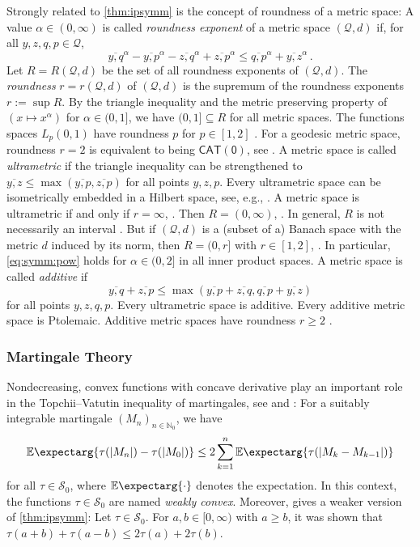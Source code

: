 \documentclass{article}
\renewcommand{\subset}{\subseteq}
\newcommand{\abs}[1]{\left| #1 \right|} %
\newcommand*{\E}{\mathbb{E}} %
\newcommand{\Ex}{\E\expectarg}
\newcommand*{\mc}[1]{\mathcal{#1}}
\newcommand*{\ms}[1]{\mathsf{#1}}
\newcommand{\N}{\mathbb{N}}
\newcommand{\Rp}{[0, \infty)} %
\newcommand{\Rpp}{(0, \infty)} %
\newcommand{\equationFullstop}{\, .}
\newcommand{\eqfs}{\equationFullstop}
\newcommand{\ol}[2]{\overline{#1,#2}}
\newcommand{\cato}{$\ms{CAT(0)}$}
\newcommand{\tran}{\tau}
\newcommand{\setcco}{\mc S_0}
\begin{document}
Strongly related to \cref{thm:ipsymm} is the concept of roundness of a metric space: A value $\alpha\in\Rpp$ is called \textit{roundness exponent} of a metric space $(\mc Q, d)$ if, for all $y,z,q,p\in\mc Q$,
\begin{equation}\label{eq:symm:pow}
	\ol yq^\alpha  - \ol yp^\alpha - \ol zq^\alpha + \ol zp^\alpha \leq \ol qp^\alpha + \ol yz^\alpha
	\eqfs
\end{equation}
Let $R = R(\mc Q, d)$ be the set of all roundness exponents of $(\mc Q, d)$. The \textit{roundness} $r = r(\mc Q, d)$ of $(\mc Q, d)$ is the supremum of the roundness exponents $r := \sup R$. By the triangle inequality and the metric preserving property of $(x \mapsto x^\alpha)$ for $\alpha \in(0,1]$, we have $(0, 1] \subset R$ for all metric spaces. The functions spaces $L_p(0,1)$ have roundness $p$ for $p\in[1,2]$ \cite{enflo70lp}. For a geodesic metric space, roundness $r=2$ is equivalent to being \cato, see \cite[Remark 7]{berg08}. A metric space is called \textit{ultrametric} if the triangle inequality can be strengthened to $\ol yz \leq \max(\ol yp, \ol zp)$ for all points $y,z,p$. Every ultrametric space can be isometrically embedded in a Hilbert space, see, e.g., \cite[Corollary 5.4]{faver14}. A metric space is ultrametric if and only if $r = \infty$, \cite[Theorem 5.1]{faver14}. Then $R = (0, \infty)$, \cite[Proposition 2.7]{faver14}. In general, $R$ is not necessarily an interval \cite[Remark p.\ 254]{enflo70}. But if $(\mc Q, d)$ is a (subset of a) Banach space with the metric $d$ induced by its norm, then $R = (0, r]$ with $r \in [1,2]$, \cite[Proposition 4.1.2]{enflo70}. In particular, \eqref{eq:symm:pow} holds for $\alpha\in(0,2]$ in all inner product spaces. A metric space is called \textit{additive} if 
\begin{equation}
	\ol yq + \ol zp \leq \max(\ol yp + \ol zq, \ol qp + \ol yz)
\end{equation}
for all points $y,z,q,p$. Every ultrametric space is additive. Every additive metric space is Ptolemaic. Additive metric spaces have roundness $r \geq 2$ \cite[Proposition 4.1]{faver14}.
%
%
%
\subsubsection{Martingale Theory}
%
Nondecreasing, convex functions with concave derivative play an important role in the Topchii--Vatutin inequality of martingales, see \cite[Theorem 2]{topchii98} and \cite{alsmeyer03}: For a suitably integrable martingale $(M_n)_{n\in\N_0}$, we have
\begin{equation}
	\Ex{\tran(\abs{M_n}) - \tran(\abs{M_0})} \leq 2 \sum_{k=1}^n \Ex{\tran(\abs{M_k-M_{k-1}})}
\end{equation}
for all $\tran\in\setcco$, where $\Ex{\cdot}$ denotes the expectation. In this context, the functions $\tran\in\setcco$ are named \textit{weakly convex}.
Moreover, \cite[Lemma 6]{topchii98} gives a weaker version of \cref{thm:ipsymm}:
Let $\tran \in \setcco$. For $a,b\in\Rp$ with $a\geq b$, it was shown that $\tran(a+b) + \tran(a-b) \leq 2 \tran(a) + 2 \tran(b)$.
%
%
%
\end{document}
